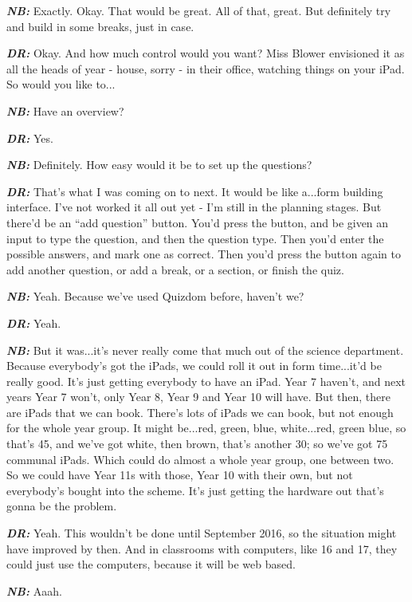 \textit{\textbf{NB:}} Exactly. Okay. That would be great. All of that, great. But definitely try and build in some breaks, just in case.

\textit{\textbf{DR:}} Okay. And how much control would you want? Miss Blower envisioned it as all the heads of year - house, sorry - in their office, watching things on your iPad. So would you like to...

\textit{\textbf{NB:}} Have an overview?

\textit{\textbf{DR:}} Yes.

\textit{\textbf{NB:}} Definitely. How easy would it be to set up the questions?

\textit{\textbf{DR:}} That's what I was coming on to next. It would be like a...form building interface. I've not worked it all out yet - I'm still in the planning stages. But there'd be an ``add question'' button. You'd press the button, and be given an input to type the question, and then the question type. Then you'd enter the possible answers, and mark one as correct. Then you'd press the button again to add another question, or add a break, or a section, or finish the quiz.

\textit{\textbf{NB:}} Yeah. Because we've used Quizdom before, haven't we?

\textit{\textbf{DR:}} Yeah.

\textit{\textbf{NB:}} But it was...it's never really come that much out of the science department. Because everybody's got the iPads, we could roll it out in form time...it'd be really good. It's just getting everybody to have an iPad. Year 7 haven't, and next years Year 7 won't, only Year 8, Year 9 and Year 10 will have. But then, there are iPads that we can book. There's lots of iPads we can book, but not enough for the whole year group. It might be...red, green, blue, white...red, green blue, so that's 45, and we've got white, then brown, that's another 30; so we've got 75 communal iPads. Which could do almost a whole year group, one between two. So we could have Year 11s with those, Year 10 with their own, but not everybody's bought into the scheme. It's just getting the hardware out that's gonna be the problem.

\textit{\textbf{DR:}} Yeah. This wouldn't be done until September 2016, so the situation might have improved by then. And in classrooms with computers, like 16 and 17, they could just use the computers, because it will be web based.

\textit{\textbf{NB:}} Aaah.

